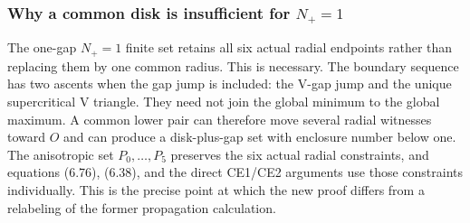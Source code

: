 \subsubsection{Why a common disk is insufficient for $N_+=1$}

The one-gap $N_+=1$ finite set retains all six actual radial endpoints rather
than replacing them by one common radius.  This is necessary.  The boundary
sequence has two ascents when the gap jump is included: the V-gap jump and the
unique supercritical V triangle.  They need not join the global minimum to the global
maximum.  A common lower pair can therefore move several radial witnesses
toward $O$ and can produce a disk-plus-gap set with enclosure number below
one.  The anisotropic set $P_0,\ldots,P_5$ preserves the six actual radial
constraints, and equations (6.76), (6.38), and the direct CE1/CE2 arguments
use those constraints individually.  This is the precise point at which the
new proof differs from a relabeling of the former propagation calculation.
